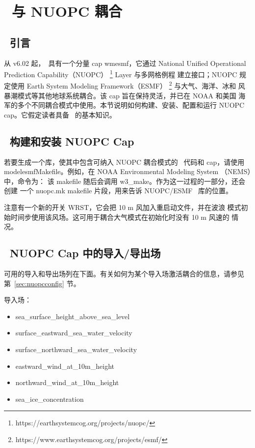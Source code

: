 \pagestyle{myheadings} \setcounter{page}{1} \setcounter{footnote}{0}

\section{~与 NUOPC 耦合} \label{app:nuopc}
\newcounters

\vssub
\subsection{~引言} \label{sec:nuopcintro}
\vssub

从 v6.02 起，\ws\ 具有一个分量 cap {\code wmesmf}，它通过 National
Unified Operational Prediction Capability（NUOPC）
\footnote{https://earthsystemcog.org/projects/nuopc/} Layer 与多网格例程
建立接口；NUOPC 规定使用 Earth System Modeling Framework（ESMF）
\footnote{https://www.earthsystemcog.org/projects/esmf/} 与大气、海洋、冰和
风暴潮模式等其他地球系统耦合。该 cap 旨在保持灵活，并已在 NOAA 和美国
海军的多个不同耦合模式中使用。本节说明如何构建、安装、配置和运行 NUOPC
cap。它假定读者具备 \ws\ 的基本知识。

\vssub
\subsection{~构建和安装 NUOPC Cap} \label{sec:nuopcbuild}
\vssub

若要生成一个库，使其中包含可纳入 NUOPC 耦合模式的 \ws\ 代码和 cap，请使用
{\code model\/esmf\/Makefile}。例如，在 NOAA Environmental Modeling System
（NEMS）中，命令为：
该 makefile 随后会调用 {\code w3\_make}。作为这一过程的一部分，还会创建
一个 nuopc.mk makefile 片段，用来告诉 NUOPC/ESMF \ws\ 库的位置。

注意有一个新的开关 {\code WRST}，它会把 10 m 风加入重启动文件，并在波浪
模式初始时间步使用该风场。这可用于耦合大气模式在初始化时没有 10 m 风速的
情况。

\vssub
\subsection{~NUOPC Cap 中的导入/导出场} \label{sec:nuopcfields}
\vssub

可用的导入和导出场列在下面。有关如何为某个导入场激活耦合的信息，请参见
第~\ref{sec:nuopcconfig} 节。

\noindent 导入场：
\begin{itemize}
\item sea\_surface\_height\_above\_sea\_level
\item surface\_eastward\_sea\_water\_velocity
\item surface\_northward\_sea\_water\_velocity
\item eastward\_wind\_at\_10m\_height
\item northward\_wind\_at\_10m\_height
\item sea\_ice\_concentration
\end{itemize}

